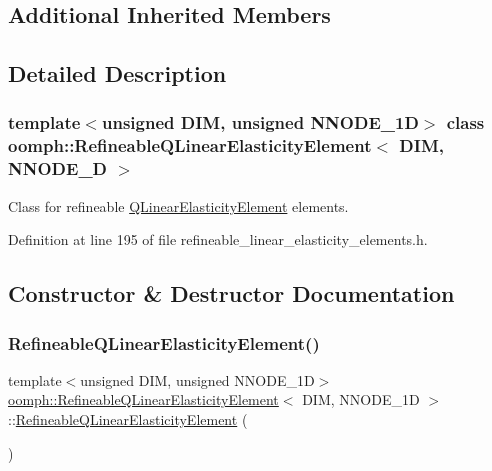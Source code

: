 \subsection*{Additional Inherited Members}


\subsection{Detailed Description}
\subsubsection*{template$<$unsigned D\+IM, unsigned N\+N\+O\+D\+E\+\_\+1D$>$\newline
class oomph\+::\+Refineable\+Q\+Linear\+Elasticity\+Element$<$ D\+I\+M, N\+N\+O\+D\+E\+\_\+D $>$}

Class for refineable \hyperlink{classoomph_1_1QLinearElasticityElement}{Q\+Linear\+Elasticity\+Element} elements. 

Definition at line 195 of file refineable\+\_\+linear\+\_\+elasticity\+\_\+elements.\+h.



\subsection{Constructor \& Destructor Documentation}
\mbox{\label{classoomph_1_1RefineableQLinearElasticityElement_a869786d1cc68db07a17d8a5b44cfd0a6}} 
\subsubsection{\texorpdfstring{Refineable\+Q\+Linear\+Elasticity\+Element()}{RefineableQLinearElasticityElement()}}
{\footnotesize\ttfamily template$<$unsigned D\+IM, unsigned N\+N\+O\+D\+E\+\_\+1D$>$ \\
\hyperlink{classoomph_1_1RefineableQLinearElasticityElement}{oomph\+::\+Refineable\+Q\+Linear\+Elasticity\+Element}$<$ D\+IM, N\+N\+O\+D\+E\+\_\+1D $>$\+::\hyperlink{classoomph_1_1RefineableQLinearElasticityElement}{Refineable\+Q\+Linear\+Elasticity\+Element} (\begin{DoxyParamCaption}{ }\end{DoxyParamCaption})\hspace{0.3cm}{\ttfamily [inline]}}



